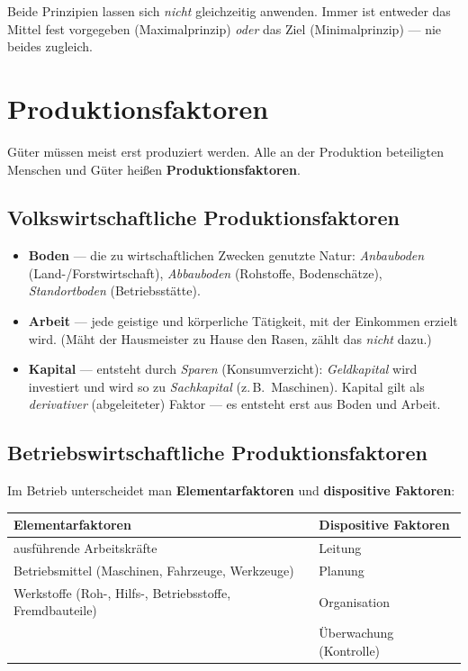 \documentclass[11pt, a4paper]{article}
\begin{document}
\begin{merksatz}
Beide Prinzipien lassen sich \emph{nicht} gleichzeitig anwenden. Immer ist entweder das
Mittel fest vorgegeben (Maximalprinzip) \emph{oder} das Ziel (Minimalprinzip) --- nie
beides zugleich.
\end{merksatz}

\section{Produktionsfaktoren}

Güter müssen meist erst produziert werden. Alle an der Produktion beteiligten Menschen und
Güter heißen \textbf{Produktionsfaktoren}.

\subsection{Volkswirtschaftliche Produktionsfaktoren}

\begin{itemize}
  \item \textbf{Boden} --- die zu wirtschaftlichen Zwecken genutzte Natur:
    \emph{Anbauboden} (Land-/Forstwirtschaft), \emph{Abbauboden} (Rohstoffe, Bodenschätze),
    \emph{Standortboden} (Betriebsstätte).
  \item \textbf{Arbeit} --- jede geistige und körperliche Tätigkeit, mit der Einkommen
    erzielt wird. (Mäht der Hausmeister zu Hause den Rasen, zählt das \emph{nicht} dazu.)
  \item \textbf{Kapital} --- entsteht durch \emph{Sparen} (Konsumverzicht): \emph{Geldkapital}
    wird investiert und wird so zu \emph{Sachkapital} (z.\,B.\ Maschinen). Kapital gilt als
    \emph{derivativer} (abgeleiteter) Faktor --- es entsteht erst aus Boden und Arbeit.
\end{itemize}

\subsection{Betriebswirtschaftliche Produktionsfaktoren}

Im Betrieb unterscheidet man \textbf{Elementarfaktoren} und \textbf{dispositive Faktoren}:

\begin{center}
\begin{tabular}{p{6.7cm} p{6.7cm}}
\toprule
\textbf{Elementarfaktoren} & \textbf{Dispositive Faktoren}\\
\midrule
ausführende Arbeitskräfte & Leitung\\
Betriebsmittel (Maschinen, Fahrzeuge, Werkzeuge) & Planung\\
Werkstoffe (Roh-, Hilfs-, Betriebsstoffe, Fremdbauteile) & Organisation\\
 & Überwachung (Kontrolle)\\
\bottomrule
\end{tabular}
\end{center}
\end{document}
